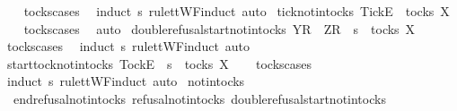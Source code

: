 \begin{isabellebody}
%
\isadelimproof
\ \ %
\endisadelimproof
%
\isatagproof
{}\isamarkupfalse%
\ tocks{\isachardot}cases\ \isamarkupfalse%
\ {\isacharparenleft}induct\ s\ rule{\isacharcolon}ttWF{\isachardot}induct{\isacharcomma}\ auto{\isacharparenright}%
\endisatagproof
{\isafoldproof}%
%
\isadelimproof
\isanewline
%
\endisadelimproof
\isanewline
{}\isamarkupfalse%
\ tick{\isacharunderscore}notin{\isacharunderscore}tocks{\isacharcolon}\ {\isachardoublequoteopen}{\isacharbrackleft}{\isacharbrackleft}Tick{\isacharbrackright}\isactrlsub E{\isacharbrackright}\ {\isasymnotin}\ tocks\ X{\isachardoublequoteclose}\isanewline
%
\isadelimproof
\ \ %
\endisadelimproof
%
\isatagproof
{}\isamarkupfalse%
\ tocks{\isachardot}cases\ \isamarkupfalse%
\ {\isacharparenleft}auto{\isacharparenright}%
\endisatagproof
{\isafoldproof}%
%
\isadelimproof
\isanewline
%
\endisadelimproof
\isanewline
{}\isamarkupfalse%
\ double{\isacharunderscore}refusal{\isacharunderscore}start{\isacharunderscore}notin{\isacharunderscore}tocks{\isacharcolon}\ {\isachardoublequoteopen}{\isacharbrackleft}Y{\isacharbrackright}\isactrlsub R\ {\isacharhash}\ {\isacharbrackleft}Z{\isacharbrackright}\isactrlsub R\ {\isacharhash}\ s\ {\isasymnotin}\ tocks\ X{\isachardoublequoteclose}\isanewline
%
\isadelimproof
\ \ %
\endisadelimproof
%
\isatagproof
{}\isamarkupfalse%
\ tocks{\isachardot}cases\ \isamarkupfalse%
\ {\isacharparenleft}induct\ s\ rule{\isacharcolon}ttWF{\isachardot}induct{\isacharcomma}\ auto{\isacharparenright}%
\endisatagproof
{\isafoldproof}%
%
\isadelimproof
\isanewline
%
\endisadelimproof
\isanewline
{}\isamarkupfalse%
\ start{\isacharunderscore}tock{\isacharunderscore}notin{\isacharunderscore}tocks{\isacharcolon}\ {\isachardoublequoteopen}{\isacharbrackleft}Tock{\isacharbrackright}\isactrlsub E\ {\isacharhash}\ s\ {\isasymnotin}\ tocks\ X{\isachardoublequoteclose}\isanewline
%
\isadelimproof
\ \ %
\endisadelimproof
%
\isatagproof
{}\isamarkupfalse%
\ tocks{\isachardot}cases\ \isamarkupfalse%
\ {\isacharparenleft}induct\ s\ rule{\isacharcolon}ttWF{\isachardot}induct{\isacharcomma}\ auto{\isacharparenright}%
\endisatagproof
{\isafoldproof}%
%
\isadelimproof
\isanewline
%
\endisadelimproof
\isanewline
{}\isamarkupfalse%
\ notin{\isacharunderscore}tocks\ {\isacharequal}\ \isanewline
\ \ end{\isacharunderscore}refusal{\isacharunderscore}notin{\isacharunderscore}tocks\ refusal{\isacharunderscore}notin{\isacharunderscore}tocks\ double{\isacharunderscore}refusal{\isacharunderscore}start{\isacharunderscore}notin{\isacharunderscore}tocks\isanewline

\end{isabellebody}
